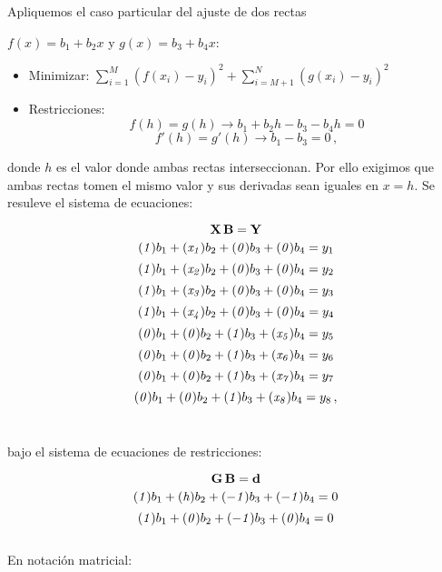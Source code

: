 \documentclass[
]{agujournal2019}
\begin{document}
Apliquemos el caso particular del ajuste de dos rectas

\(f(x)=b_1 + b_2 x\) y \(g(x)=b_3 + b_4 x\):\\

\begin{itemize}
\item Minimizar:  $\sum\limits^M_{i=1}(f(x_i)-y_i)^2 + \sum\limits^N_{i=M+1}(g(x_i)-y_i)^2$
\item Restricciones:
      $$f(h)=g(h)\rightarrow b_1+b_2 h - b_3 -b_4 h=0$$
      $$f'(h)=g'(h)\rightarrow b_1          - b_3           =0\,,$$
\end{itemize}

donde \(h\) es el valor donde ambas rectas interseccionan. Por ello
exigimos que ambas rectas tomen el mismo valor y sus derivadas sean
iguales en \(x=h\). Se resuleve el sistema de ecuaciones:

\[{\textbf X}\,{\textbf B}={\textbf Y}\]
\[({\it 1})b_1+({\it x_1})b_2 + ({\it 0})b_3 + ({\it 0})b_4=y_1\]
\[({\it 1})b_1+({\it x_2})b_2 + ({\it 0})b_3 + ({\it 0})b_4=y_2\]
\[({\it 1})b_1+({\it x_3})b_2 + ({\it 0})b_3 + ({\it 0})b_4=y_3\]
\[({\it 1})b_1+({\it x_4})b_2 + ({\it 0})b_3 + ({\it 0})b_4=y_4\]
\[({\it 0})b_1+({\it 0})b_2 + ({\it 1})b_3 + ({\it x_5})b_4=y_5\]
\[({\it 0})b_1+({\it 0})b_2 + ({\it 1})b_3 + ({\it x_6})b_4=y_6\]
\[({\it 0})b_1+({\it 0})b_2 + ({\it 1})b_3 + ({\it x_7})b_4=y_7\]
\[({\it 0})b_1+({\it 0})b_2 + ({\it 1})b_3 + ({\it x_8})b_4=y_8\,,\] ~

bajo el sistema de ecuaciones de restricciones:

\[{\textbf G}\,{\textbf B}={\textbf d}\]
\[({\it 1})b_1+({\it h})b_2 + (-{\it 1})b_3 + (-{\it 1})b_4=0\]
\[({\it 1})b_1+({\it 0})b_2 + (-{\it 1})b_3 + ({\it 0})b_4=0\]\\

En notación matricial:\\
\end{document}

